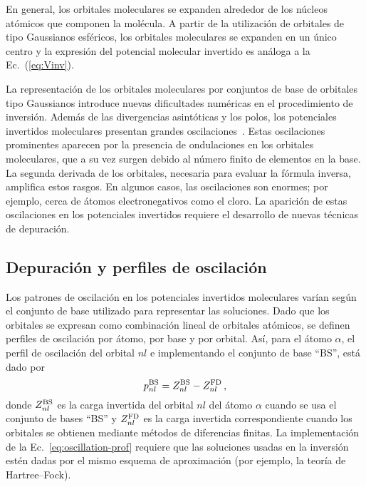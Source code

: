 En general, los orbitales moleculares se expanden alrededor de los 
núcleos atómicos que componen la molécula. A partir de la utilización
de orbitales de tipo Gaussianos esféricos, los orbitales moleculares se 
expanden en un único centro y la expresión del potencial molecular 
invertido es análoga a la Ec.~(\ref{eq:Vinv}). 

La representación de los orbitales moleculares por conjuntos de base de 
orbitales tipo Gaussianos introduce nuevas dificultades numéricas en el 
procedimiento de inversión. Además de las divergencias asintóticas y los 
polos, los potenciales invertidos moleculares presentan grandes 
oscilaciones~\cite{Schipper:97,Jacob:11,Gaiduk:13}. Estas oscilaciones 
prominentes aparecen por la presencia de ondulaciones en los orbitales 
moleculares, que a su vez surgen debido al número finito de elementos en 
la base. La segunda derivada de los orbitales, necesaria para evaluar la 
fórmula inversa, amplifica estos rasgos. En algunos casos, las 
oscilaciones son enormes; por ejemplo, cerca de átomos electronegativos 
como el cloro. La aparición de estas oscilaciones en los potenciales 
invertidos requiere el desarrollo de nuevas técnicas de depuración.

\subsection{Depuración y perfiles de oscilación}
\label{sec:invmol}

Los patrones de oscilación en los potenciales invertidos moleculares 
varían según el conjunto de base utilizado para representar las 
soluciones. Dado que los orbitales se expresan como combinación lineal 
de orbitales atómicos, se definen perfiles de oscilación por átomo, por base y por orbital. Así, para el átomo $\alpha$, el perfil de oscilación
del orbital $nl$ e implementando el conjunto de base ``BS'', está dado 
por
\begin{equation}
 p_{nl}^{\mbox{\scriptsize BS}} = Z_{nl}^{\mbox{\scriptsize BS}}-
 Z_{nl}^{\mbox{\scriptsize FD}} \,,
 \label{eq:oscillation-prof}
\end{equation}
donde $Z_{nl}^{\mbox{\scriptsize BS}}$ es la carga invertida del orbital
$nl$ del átomo $\alpha$ cuando se usa el conjunto de bases ``BS'' y 
$Z_{nl}^{\mbox{\scriptsize FD}}$ es la carga invertida correspondiente 
cuando los orbitales se obtienen mediante métodos de diferencias 
finitas. La implementación de la Ec.~\ref{eq:oscillation-prof} requiere 
que las soluciones usadas en la inversión estén dadas por el mismo 
esquema de aproximación (por ejemplo, la teoría de Hartree--Fock).

